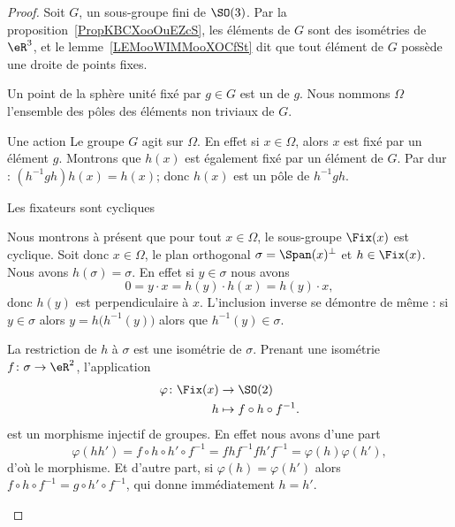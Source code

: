 \begin{proof}
    Soit \( G\), un sous-groupe fini de \( \SO(3)\). Par la proposition~\ref{PropKBCXooOuEZcS}, les éléments de \( G\) sont des isométries de \( \eR^3\), et le lemme~\ref{LEMooWIMMooXOCfSt} dit que tout élément de \( G\) possède une droite de points fixes.

    Un point de la sphère unité fixé par \( g\in G\) est un  de \( g\). Nous nommons \( \Omega\) l'ensemble des pôles des éléments non triviaux de \( G\).
    \begin{subproof}
        \item[Une action]
            Le groupe \( G\) agit sur \( \Omega\). En effet si \( x\in \Omega\), alors \( x\) est fixé par un élément \( g\). Montrons que \( h(x)\) est également fixé par un élément de \( G\). Par dur : \( (h^{-1}gh)h(x)=h(x)\); donc \( h(x)\) est un pôle de \( h^{-1} gh\).

        \item[Les fixateurs sont cycliques]

            Nous montrons à présent que pour tout \( x\in\Omega\), le sous-groupe \( \Fix(x)\) est cyclique. Soit donc \( x\in\Omega\), le plan orthogonal \( \sigma=\Span(x)^{\perp}\) et \( h\in \Fix(x)\). Nous avons \( h(\sigma)=\sigma\). En effet si \( y\in \sigma\) nous avons
            \begin{equation}
                0=y\cdot x=h(y)\cdot h(x)=h(y)\cdot x,
            \end{equation}
            donc \( h(y)\) est perpendiculaire à \( x\). L'inclusion inverse se démontre de même : si \( y\in \sigma\) alors \( y=h\big( h^{-1}(y) \big)\) alors que \( h^{-1}(y)\in \sigma\).

            La restriction de \( h\) à \( \sigma\) est une isométrie de \( \sigma\). Prenant une isométrie \( f\colon \sigma\to \eR^2\), l'application
            \begin{equation}
                \begin{aligned}
                    \varphi\colon \Fix(x)&\to \SO(2) \\
                    h&\mapsto f\circ h\circ f^{-1}.
                \end{aligned}
            \end{equation}
            est un morphisme injectif de groupes. En effet nous avons d'une part
            \begin{equation}
                \varphi(hh')=f\circ h\circ h'\circ f^{-1}=fhf^{-1}fh'f^{-1}=\varphi(h)\varphi(h'),
            \end{equation}
            d'où le morphisme. Et d'autre part, si \( \varphi(h)=\varphi(h')\) alors \( f\circ h\circ f^{-1}=g\circ h'\circ f^{-1}\), qui donne immédiatement \( h=h'\).


\end{subproof}
\end{proof}
